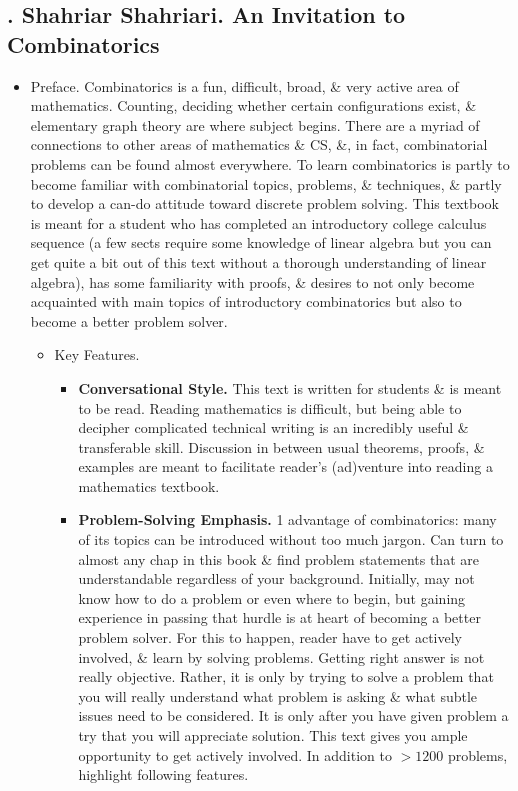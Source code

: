\documentclass{article}
\begin{document}
\subsection{\cite{Shahriari2022}. {\sc Shahriar Shahriari}. An Invitation to Combinatorics}
{}
\begin{itemize}
	\item {\sf Preface.} Combinatorics is a fun, difficult, broad, \& very active area of mathematics. Counting, deciding whether certain configurations exist, \& elementary graph theory are where subject begins. There are a myriad of connections to other areas of mathematics \& CS, \&, in fact, combinatorial problems can be found almost everywhere. To learn combinatorics is partly to become familiar with combinatorial topics, problems, \& techniques, \& partly to develop a can-do attitude toward discrete problem solving. This textbook is meant for a student who has completed an introductory college calculus sequence (a few sects require some knowledge of linear algebra but you can get quite a bit out of this text without a thorough understanding of linear algebra), has some familiarity with proofs, \& desires to not only become acquainted with main topics of introductory combinatorics but also to become a better problem solver.
	\begin{itemize}
		\item {\sf Key Features.}
		\begin{itemize}
			\item {\bf Conversational Style.} This text is written for students \& is meant to be read. Reading mathematics is difficult, but being able to decipher complicated technical writing is an incredibly useful \& transferable skill. Discussion in between usual theorems, proofs, \& examples are meant to facilitate reader's (ad)venture into reading a mathematics textbook.
			\item {\bf Problem-Solving Emphasis.} 1 advantage of combinatorics: many of its topics can be introduced without too much jargon. Can turn to almost any chap in this book \& find problem statements that are understandable regardless of your background. Initially, may not know how to do a problem or even where to begin, but gaining experience in passing that hurdle is at heart of becoming a better problem solver. For this to happen, reader have to get actively involved, \& learn by solving problems. Getting right answer is not really objective. Rather, it is only by trying to solve a problem that you will really understand what problem is asking \& what subtle issues need to be considered. It is only after you have given problem a try that you will appreciate solution. This text gives you ample opportunity to get actively involved. In addition to $> 1200$ problems, highlight following features.

\end{itemize}
\end{itemize}
\end{itemize}
\end{document}
